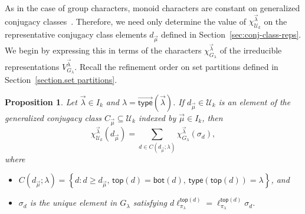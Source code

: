 \documentclass[10pt]{amsart}
\newtheorem{prop}[theorem]{Proposition}
\theoremstyle{definition}
\theoremstyle{remark}
\newcommand{\vtype}{\overrightarrow{\mathsf{type}}}
\begin{document}
As in the case of group characters, monoid characters are constant on
generalized conjugacy classes~\cite[Proposition~7.9]{Steinberg.2016}.
Therefore, we need only determine the value of
$\chi^{\vec{\lambda}}_{\mathcal{U}_k}$
on the representative conjugacy class elements
$d_{\vec{\mu}}$ defined in Section~\ref{sec:conj-class-reps}.
We begin by expressing this in terms of the characters
$\chi^{\vec{\lambda}}_{G_\lambda}$
of the irreducible representations $V^{\vec{\lambda}}_{G_\lambda}$.
Recall the refinement order on set partitions defined in Section~\ref{section.set partitions}.

\begin{prop}
\label{prop:char}
Let $\vec{\lambda} \in I_k$ and $\lambda = \vtype(\vec{\lambda})$.
If $d_{\vec{\mu}} \in \mathcal{U}_k$ is an element of the generalized conjugacy
class $C_{\vec{\mu}} \subseteq \mathcal{U}_k$ indexed by $\vec{\mu} \in I_k$, then
\[
    \chi^{\vec{\lambda}}_{\mathcal{U}_k}(d_{\vec{\mu}})
    = \sum_{d \in C(d_{\vec{\mu}}; \lambda)} \chi^{\vec{\lambda}}_{G_\lambda}(\sigma_d),
\]
where
\begin{itemize}
    \item
        $C(d_{\vec{\mu}}; \lambda)
        = \left\{
        d : d \geqslant d_{\vec{\mu}}, \,
        \mathsf{top}(d) = \mathsf{bot}(d), \, \mathsf{type}(\mathsf{top}(d))=\lambda
        \right\}$, and
    \item
        $\sigma_d$ is the unique element in $G_\lambda$ satisfying
        $d \ell_{\pi_\lambda}^{\mathsf{top}(d)} = \ell_{\pi_\lambda}^{\mathsf{top}(d)} \sigma_d$.
\end{itemize}
\end{prop}
\end{document}

